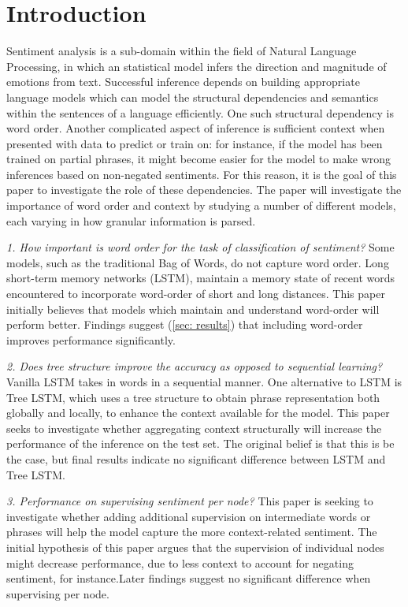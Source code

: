 \section{Introduction}
\label{sec: intro}
Sentiment analysis is a sub-domain within the field of Natural Language
Processing, in which an statistical model infers the direction and magnitude of
emotions from text. Successful inference depends on building appropriate
language models which can model the structural dependencies and semantics within
the sentences of a language efficiently. One such structural dependency is word
order. Another complicated aspect of inference is sufficient context when
presented with data to predict or train on: for instance, if the model has been
trained on partial phrases, it might become easier for the model to make wrong
inferences based on non-negated sentiments. For this reason, it is the goal of
this paper to investigate the role of these dependencies. The paper will
investigate the importance of word order and context by studying a number of
different models, each varying in how granular information is parsed.

    \textit{1. How important is word order for the task of classification of
    sentiment?} Some models, such as the traditional Bag of Words, do not
    capture word order. Long short-term memory networks (LSTM), maintain a
    memory state of recent words encountered to incorporate word-order of short
    and long distances. This paper initially believes that models which maintain
    and understand word-order will perform better. Findings suggest (\ref{sec:
    results}) that including word-order improves performance significantly.

    \textit{2. Does tree structure improve the accuracy as opposed to sequential
    learning?} Vanilla LSTM takes in words in a sequential manner. One
    alternative to LSTM is Tree LSTM, which uses a tree structure to obtain
    phrase representation both globally and locally, to enhance the context
    available for the model. This paper seeks to investigate whether aggregating
    context structurally will increase the performance of the inference on the
    test set. The original belief is that this is be the case, but final results
    indicate no significant difference between LSTM and Tree LSTM.
    
    \textit{3. Performance on supervising sentiment per node?}
    This paper is seeking to investigate whether adding additional supervision
    on intermediate words or phrases will help the model capture the more
    context-related sentiment. The initial hypothesis of this paper argues that the
    supervision of individual nodes might decrease performance, due to less context
    to account for negating sentiment, for instance.Later findings suggest no
    significant difference when supervising per node.

